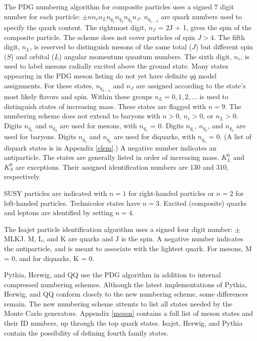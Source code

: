 The PDG numbering algorithm for composite particles uses a
signed 7 digit number for each particle:  $\pm nn_rn_Ln_{q_1}n_{q_2}n_{q_3}n_J$.
$n_{q_{1-3}}$ are quark numbers used to specify the quark content.
The rightmost digit, $n_J$ = 2J + 1, gives the spin of the composite particle.
The scheme does not cover particles of spin $J>4$.
The fifth digit, $n_L$, is reserved to distinguish mesons of the
same total ($J$) but different spin ($S$) and orbital ($L$)
angular momentum quantum numbers.
The sixth digit, $n_r$, is used to label mesons radially excited
above the ground state.
Many states appearing in the PDG meson listing do not yet have definite
$q\bar q$ model assignments.  For these states, $n_{q_{2-3}}$
and $n_J$ are assigned according to the state's most likely flavors
and spin.  Within these groups $n_L=0,1,2,\dots$ is used to distinguish
states of increasing mass. These states are flagged with $n=9$.
The numbering scheme does not extend to baryons with $n>0$, $n_r>0$, or $n_L>0$.
Digits $n_{q_2}$ and $n_{q_3}$ are used for mesons, with $n_{q_1}$ = 0.
Digits $n_{q_1}$, $n_{q_2}$, and $n_{q_3}$ are used for baryons.
Digits $n_{q_1}$ and $n_{q_2}$ are used for diquarks, with $n_{q_3}$ = 0.
(A list of diquark states is in Appendix \ref{elem}.)  A negative number
indicates an antiparticle.  The states are generally listed in order of
increasing mass.  $K_L^0$ and $K_S^0$ are exceptions.  Their assigned
identification numbers are 130 and 310, respectively.

SUSY particles are indicated with $n=1$ for right-handed particles or $n=2$
for left-handed particles.  Technicolor states have $n=3$.
Excited (composite) quarks and leptons are identified by setting $n=4$.

The Isajet particle identification algorithm uses a signed four digit
number: $\pm$MLKJ.  M, L, and K are quarks and J is the spin.  A negative
number indicates the antiparticle, and is meant to associate with the
lightest quark.  For mesons, M = 0, and for diquarks, K = 0.

Pythia, Herwig, and QQ use the PDG algorithm in addition to internal
compressed numbering schemes.
Although the latest implementations of Pythia, Herwig, and QQ conform closely
to the new numbering scheme, some differences remain.
The new numbering scheme attemts to list all states needed by the
Monte Carlo generators.  Appendix \ref{meson}
contains a full list of meson states and their ID numbers, up through the
top quark states.  Isajet, Herwig, and Pythia contain the possibility of
defining fourth family states.

